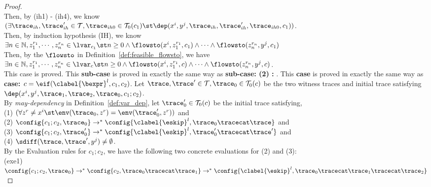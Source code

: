 \begin{proof}
\\
Then, by (ih1) - (ih4), we know\\
 $(\exists \trace_{ih}, \trace_{ih}' \in \mathcal{T}, 
\trace_{ih0} \in \mathcal{T}_0(c_1) \st \dep(x^i, y^j, \trace_{ih}, \trace_{ih}', \trace_{ih0}, {c_1}) )$.
\\
Then, by induction hypothesis (IH), we know 
\\
$\exists n \in \mathbb{N}, z_1^{r_1}, \cdots, z_n^{r_n} \in \lvar_{{c_1}} \st n \geq 0 \land
\flowsto(x^i,  z_1^{r_1}, c_1) 
\land \cdots \land \flowsto(z_n^{r_n}, y^j, c_1)$
\\
Then, by the $\flowsto$ in Definition~\ref{def:feasible_flowsto}, we have 
\\
$\exists n \in \mathbb{N}, z_1^{r_1}, \cdots, z_n^{r_n} \in \lvar_{{c}} \st n \geq 0 \land
\flowsto(x^i,  z_1^{r_1}, c) 
\land \cdots \land \flowsto(z_n^{r_n}, y^j, c)$.
\\
This case is proved.
This \textbf{sub-case} is proved in exactly the same way as \textbf{sub-case: (2) : }.
  This \textbf{case} is proved in exactly the same way as \textbf{case: $c = \eif(\clabel{\bexpr}^{l} , {c_1}, {c_2})$}.
  Let $\trace, \trace' \in \mathcal{T}, \trace_0 \in \mathcal{T}_0(c)$ be the two witness traces and initial trace satisfying 
  $\dep(x^i, y^j, \trace_1, \trace_2, \trace_0, c_1; c_2)$.
  \\
  By \emph{may-dependency} in Definition~\ref{def:var_dep}, let $\trace_0' \in \mathcal{T}_0(c)$ be the initial trace satisfying,
  \\
  (1) $ (\forall z^r \neq x^i \st   \env(\trace_0, z^r ) =   \env(\trace_0',z^r) )$
  and \\
  (2) $\config{c_1;c_2 , \trace_0} 
  \rightarrow^{*} \config{\clabel{\eskip}^l, \trace_0  \tracecat \trace } $ 
    and \\
  (3) $\config{c_1;c_2, \trace_0'} \rightarrow^{*} \config{\clabel{\eskip}^l, \trace_0'  \tracecat \trace'}$ 
    and \\
    (4) $\sdiff(\trace, \trace', y^j ) \neq \emptyset$.
    \\
  By the Evaluation rules for $c_1;c_2$, we have the following two concrete evaluations for (2) and (3):
  \\
  (exe1) $\config{c_1;c_2 , \trace_0} 
  \rightarrow^{*} \config{c_2, \trace_0  \tracecat \trace_1}
  \rightarrow^{*} \config{\clabel{\eskip}^l, \trace_0  \tracecat \trace_1 \tracecat \trace_2 } $ \\

\end{proof}
